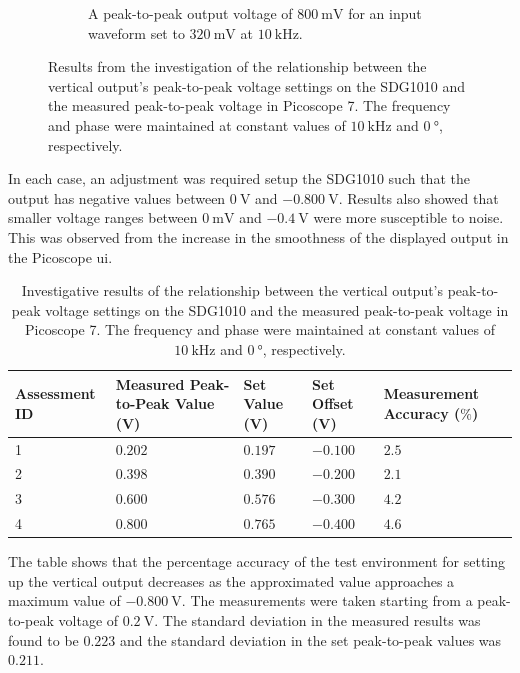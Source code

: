 \documentclass[class=report,11pt,crop=false]{standalone}
\begin{document}
\begin{figure}[h!]
\begin{subfigure}{.32\textwidth}
			\caption{A peak-to-peak output voltage of $\SI{800}{\milli\volt}$ for an input waveform set to $\SI{320}{\milli\volt}$ at $\SI{10}{\kilo\hertz}$.}
			\label{fig:hp141t-008Vpp-result}
		\end{subfigure}
		\caption{Results from the investigation of the relationship between the vertical output's peak-to-peak voltage settings on the SDG1010 and the measured peak-to-peak voltage in Picoscope 7. The frequency and phase were maintained at constant values of $\SI{10}{\kilo\hertz}$ and $\SI{0}{\degree}$, respectively.}
		\label{fig:hp141t-vert-test-results}
	\end{figure} 
	
	In each case, an adjustment was required setup the SDG1010 such that the output has negative values between $\SI{0}{\volt}$ and $-\SI{0.800}{\volt}$. Results also showed that smaller voltage ranges between $\SI{0}{\milli\volt}$ and $-\SI{0.4}{\volt}$ were more susceptible to noise. This was observed from the increase in the smoothness of the displayed output in the Picoscope \acrshort{ui}.
	
	\begin{table}[ht!]
		\centering
		\label{tab:hp141t-vert-test-results}
		\begin{tabular}{|m{5em}|m{8em}|m{8em}|m{8em}|m{8em}|}
			\hline
			\textbf{Assessment ID} & \textbf{Measured Peak-to-Peak Value} (V)	& \textbf{Set Value} (V) & \textbf{Set Offset} (V) & \textbf{Measurement Accuracy} ($\%$)\\
			\hline
			1 & $0.202$ & $0.197$ & $-0.100$ & $2.5$\\
			\hline
			2 & $0.398$ & $0.390$ & $-0.200$ & $2.1$\\
			\hline
			3 & $0.600$ & $0.576$ & $-0.300$ & $4.2$\\
			\hline
			4 & $0.800$ & $0.765$ & $-0.400$ & $4.6$\\
			\hline
		\end{tabular}
		\caption{Investigative results of the relationship between the vertical output's peak-to-peak voltage settings on the SDG1010 and the measured peak-to-peak voltage in Picoscope 7. The frequency and phase were maintained at constant values of $\SI{10}{\kilo\hertz}$ and $\SI{0}{\degree}$, respectively.}
	\end{table}
	The table shows that the percentage accuracy of the test environment for setting up the vertical output decreases as the approximated value approaches a maximum value of $-\SI{0.800}{\volt}$. The measurements were taken starting from a peak-to-peak voltage of $\SI{0.2}{\volt}$. The standard deviation in the measured results was found to be $0.223$ and the standard deviation in the set peak-to-peak values was $0.211$.
	
\end{document}
